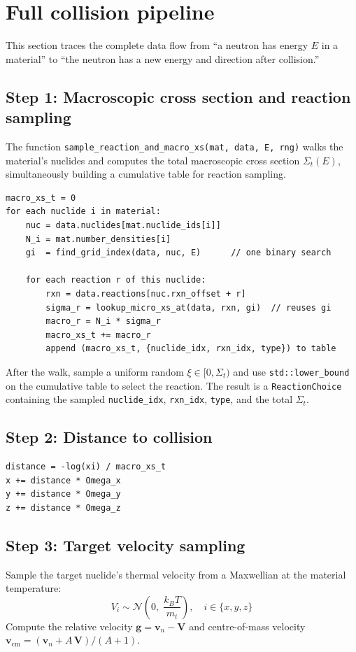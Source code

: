\documentclass[11pt,a4paper]{article}
\begin{document}
\section{Full collision pipeline}
\label{sec:pipeline}
This section traces the complete data flow from ``a neutron has energy $E$ in a material'' to ``the neutron has a new energy and direction after collision.''

\subsection{Step 1: Macroscopic cross section and reaction sampling}

The function \texttt{sample\_reaction\_and\_macro\_xs(mat, data, E, rng)} walks the material's nuclides and computes the total macroscopic cross section $\Sigma_t(E)$, simultaneously building a cumulative table for reaction sampling.

\begin{lstlisting}
macro_xs_t = 0
for each nuclide i in material:
    nuc = data.nuclides[mat.nuclide_ids[i]]
    N_i = mat.number_densities[i]
    gi  = find_grid_index(data, nuc, E)      // one binary search

    for each reaction r of this nuclide:
        rxn = data.reactions[nuc.rxn_offset + r]
        sigma_r = lookup_micro_xs_at(data, rxn, gi)  // reuses gi
        macro_r = N_i * sigma_r
        macro_xs_t += macro_r
        append (macro_xs_t, {nuclide_idx, rxn_idx, type}) to table
\end{lstlisting}

After the walk, sample a uniform random $\xi \in [0, \Sigma_t)$ and use \texttt{std::lower\_bound} on the cumulative table to select the reaction. The result is a \texttt{ReactionChoice} containing the sampled \texttt{nuclide\_idx}, \texttt{rxn\_idx}, \texttt{type}, and the total $\Sigma_t$.

\subsection{Step 2: Distance to collision}

\begin{lstlisting}
distance = -log(xi) / macro_xs_t
x += distance * Omega_x
y += distance * Omega_y
z += distance * Omega_z
\end{lstlisting}

\subsection{Step 3: Target velocity sampling}
Sample the target nuclide's thermal velocity from a Maxwellian at the material temperature:
\[
V_i \sim \mathcal{N}\!\left(0,\; \frac{k_B T}{m_t}\right), \quad i \in \{x,y,z\}
\]
Compute the relative velocity $\mathbf{g} = \mathbf{v}_n - \mathbf{V}$ and centre-of-mass velocity $\mathbf{v}_\text{cm} = (\mathbf{v}_n + A\,\mathbf{V}) / (A+1)$.
\end{document}
